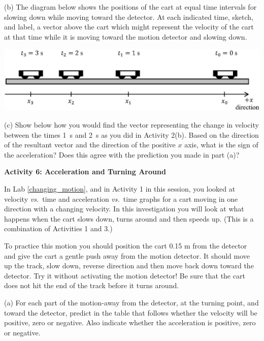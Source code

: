 (b) The diagram below shows the positions of the cart at equal time intervals
for slowing down while moving toward the detector. At each indicated time, 
sketch, and label,
a vector above the cart which might represent the velocity of the cart at that
time while it is moving toward the motion detector and slowing down.

{\par\centering \includegraphics{slowing/carts_slowing2.eps} \par}

(c) Show below how you would find the vector representing the change in velocity
between the times 1~s and 2~s as you did in Activity 2(b). Based on the 
direction of the resultant vector and the direction of the positive $x$ axis, 
what is the sign of the acceleration? 
Does this agree with the prediction you made in part (a)?
\answerspace{10mm}

\pagebreak[2]
\textbf{Activity 6: Acceleration and Turning Around }

In Lab \ref{changing_motion}, and in Activity 1 in this session, you looked at
velocity \textit{vs.}~time and acceleration \textit{vs.}~time graphs for a cart moving in one
direction with a changing velocity. In this investigation you will look at what
happens when the cart slows down, turns around and then speeds up. (This is a
combination of Activities 1 and 3.)

To practice this motion you should position the cart 0.15 m from the detector
and give the cart a gentle push away from the motion detector. It should move
up the track, slow down, reverse direction and then move back down toward the
detector. Try it without activating the motion detector! Be sure that the cart
does not hit the end of the track before it turns around. 


(a) For each part of the motion-away from the detector, at the turning point,
and toward the detector, predict in the table that follows whether the velocity
will be positive, zero or negative. Also indicate whether the acceleration is
positive, zero or negative.

